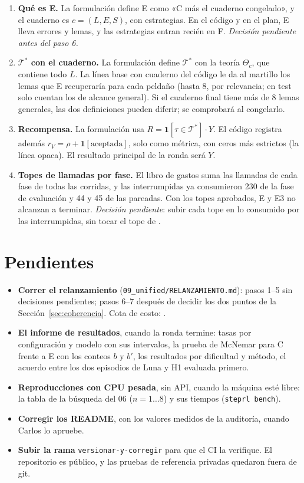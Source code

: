\documentclass[11pt]{article}
\theoremstyle{remark}
\newcommand{\T}{\mathcal{T}}
\begin{document}
\begin{enumerate}[leftmargin=*]
\item \textbf{Qué es E.} La formulación define E como «C más el cuaderno congelado», y el cuaderno es $c=(L,E,S)$, con estrategias. En el código y en el plan, E lleva errores y lemas, y las estrategias entran recién en F. \emph{Decisión pendiente antes del paso 6.}
\item \textbf{$\T^*$ con el cuaderno.} La formulación define $\T^*$ con la teoría $\Theta_c$, que contiene todo $L$. La línea base con cuaderno del código le da al martillo los lemas que E recuperaría para cada peldaño (hasta 8, por relevancia; en test solo cuentan los de alcance general). Si el cuaderno final tiene más de 8 lemas generales, las dos definiciones pueden diferir; se comprobará al congelarlo.
\item \textbf{Recompensa.} La formulación usa $R=\mathbf{1}[\tau\in\T^*]\cdot Y$. El código registra además $r_V=\rho+\mathbf{1}[\text{aceptada}]$, solo como métrica, con ceros más estrictos (la línea opaca). El resultado principal de la ronda será $Y$.
\item \textbf{Topes de llamadas por fase.} El libro de gastos suma las llamadas de cada fase de todas las corridas, y las interrumpidas ya consumieron 230 de la fase de evaluación y 44 y 45 de las pareadas. Con los topes aprobados, E y E3 no alcanzan a terminar. \emph{Decisión pendiente}: subir cada tope en lo consumido por las interrumpidas, sin tocar el tope de \GastoTope.
\end{enumerate}

\section{Pendientes}\label{sec:pendientes}

\begin{itemize}[leftmargin=*]
\item \textbf{Correr el relanzamiento} (\texttt{09\_unified/RELANZAMIENTO.md}): pasos 1--5 sin decisiones pendientes; pasos 6--7 después de decidir los dos puntos de la Sección~\ref{sec:coherencia}. Cota de costo: \CotaRelanzamiento.
\item \textbf{El informe de resultados}, cuando la ronda termine: tasas por configuración y modelo con sus intervalos, la prueba de McNemar para C frente a E con los conteos $b$ y $b'$, los resultados por dificultad y método, el acuerdo entre los dos episodios de Luna y H1 evaluada primero.
\item \textbf{Reproducciones con CPU pesada}, sin API, cuando la máquina esté libre: la tabla de la búsqueda del 06 ($n=1\ldots8$) y sus tiempos (\texttt{steprl bench}).
\item \textbf{Corregir los README}, con los valores medidos de la auditoría, cuando Carlos lo apruebe.
\item \textbf{Subir la rama} \texttt{versionar-y-corregir} para que el CI la verifique. El repositorio es público, y las pruebas de referencia privadas quedaron fuera de git.
\end{itemize}
\end{document}
